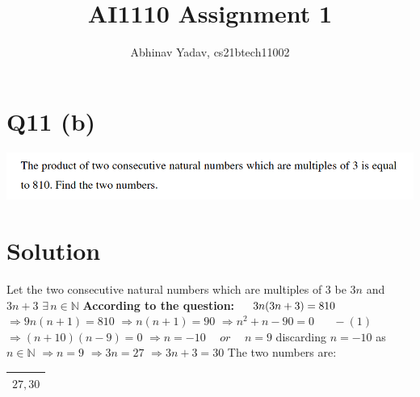 \documentclass[11pt]{article}
\title{AI1110 Assignment 1}
\author{Abhinav Yadav, cs21btech11002}
\begin{document}
    \maketitle
    \section*{Q11 (b)}
    \includegraphics[width=\textwidth]{q11_b.png}\newline
    \section*{Solution}
    Let the two consecutive natural numbers which are multiples of $3$ be $3n$ and $3n+3$
    \hspace{5pt} $\exists \hspace{2pt} n \in \mathbb{N}$
    \newline
    \textbf{According to the question:}\newline
    $\hspace*{12pt} 3n(3n+3) = 810$\newline
    $\Rightarrow 9n(n+1)=810$\newline
    $\Rightarrow n(n+1)=90$\newline
    $\Rightarrow n^2+n-90=0\hspace{20pt} -(1)$\newline
    $\Rightarrow (n+10)(n-9)=0$\newline
    $\Rightarrow n=-10 \hspace{15pt} or \hspace{15pt} n=9$\newline\newline
    \hspace*{11pt} discarding $n=-10$ as $n \in \mathbb{N}$\newline\newline
    $\Rightarrow n=9$\newline
    $\Rightarrow 3n=27$\newline
    $\Rightarrow 3n+3=30$\newline\newline
    The two numbers are:\newline
    \begin{tabular}{|c|}
        \hline
            $27, 30$\\
        \hline
    \end{tabular}\newline\newline\newline
\end{document}

